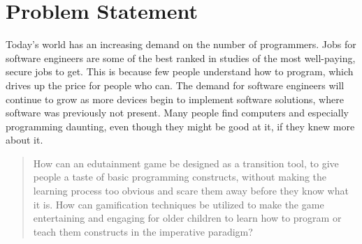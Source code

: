 \section{Problem Statement}
\label{sec:problemstatement}

Today's world has an increasing demand on the number of programmers. Jobs for software engineers are some of the best ranked in studies of the most well-paying, secure jobs to get.
This is because few people understand how to program, which drives up the price for people who can. The demand for software engineers will continue to grow as more devices begin to implement software solutions, where software was previously not present.
Many people find computers and especially programming daunting, even though they might be good at it, if they knew more about it.\newline

\begin{quotation}
	How can an edutainment game be designed as a transition tool, to give people a taste of basic programming constructs, without making the learning process too obvious and scare them away before they know what it is.
	How can gamification techniques be utilized to make the game entertaining and engaging for older children to learn how to program or teach them constructs in the imperative paradigm?
\end{quotation}
